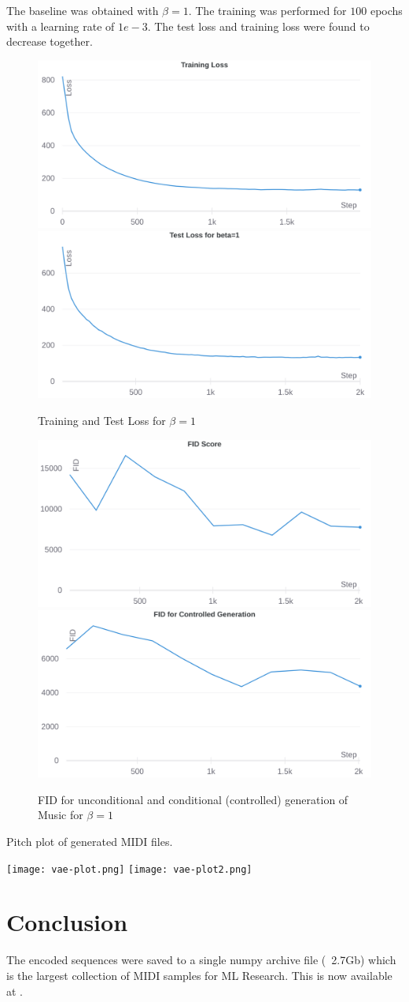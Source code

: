 \documentclass{article}
\begin{document}
The baseline was obtained with $\beta = 1$. The training was performed for $100$ epochs with a learning rate of $1e-3$. The test loss and training loss were found to decrease together.
\begin{center}

\begin{figure}
\includegraphics[width=0.4\linewidth]{training_loss_beta_1.png}
\includegraphics[width=0.4\linewidth]{test_loss_beta_1.png}
\caption{Training and Test Loss for $\beta = 1$}
\end{figure}

\begin{figure}
\includegraphics[width=0.4\linewidth]{fid_beta_1.png}
\includegraphics[width=0.4\linewidth]{controlled_fid_beta_1.png}
\caption{FID for unconditional and conditional (controlled) generation of Music for $\beta = 1$}
\end{figure}

\end{center}

Pitch plot of generated MIDI files. 

\texttt{[image: vae-plot.png]}
\texttt{[image: vae-plot2.png]}

\section{Conclusion}

The encoded sequences were saved to a single numpy archive file (~2.7Gb) which is the largest collection of MIDI samples for ML Research. This is now available at \citep{midi_note_seq_data_set}.




\end{document}
